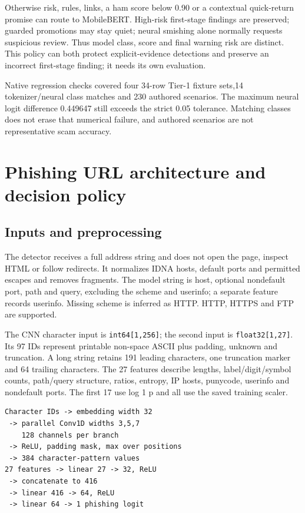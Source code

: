 \documentclass[11pt,a4paper,oneside]{report}
\newcommand{\code}[1]{\nolinkurl{#1}}
\begin{document}
Otherwise risk, rules, links, a ham score below 0.90 or a contextual quick-return promise can route to MobileBERT. High-risk first-stage findings are preserved; guarded promotions may stay quiet; neural smishing alone normally requests suspicious review. Thus model class, score and final warning risk are distinct. This policy can both protect explicit-evidence detections and preserve an incorrect first-stage finding; it needs its own evaluation.

Native regression checks covered four 34-row Tier-1 fixture sets,14 tokenizer/neural class matches and 230 authored scenarios. The maximum neural logit difference 0.449647 still exceeds the strict 0.05 tolerance. Matching classes does not erase that numerical failure, and authored scenarios are not representative scam accuracy.

\chapter{Phishing URL architecture and decision policy}
\section{Inputs and preprocessing}
The detector receives a full address string and does not open the page, inspect HTML or follow redirects. It normalizes IDNA hosts, default ports and permitted escapes and removes fragments. The model string is host, optional nondefault port, path and query, excluding the scheme and userinfo; a separate feature records userinfo. Missing scheme is inferred as HTTP. HTTP, HTTPS and FTP are supported.

The CNN character input is \code{int64[1,256]}; the second input is \code{float32[1,27]}. Its 97 IDs represent printable non-space ASCII plus padding, unknown and truncation. A long string retains 191 leading characters, one truncation marker and 64 trailing characters. The 27 features describe lengths, label/digit/symbol counts, path/query structure, ratios, entropy, IP hosts, punycode, userinfo and nondefault ports. The first 17 use log 1 p and all use the saved training scaler.

\begin{lstlisting}
Character IDs -> embedding width 32
 -> parallel Conv1D widths 3,5,7
    128 channels per branch
 -> ReLU, padding mask, max over positions
 -> 384 character-pattern values
27 features -> linear 27 -> 32, ReLU
 -> concatenate to 416
 -> linear 416 -> 64, ReLU
 -> linear 64 -> 1 phishing logit
\end{lstlisting}
\end{document}
